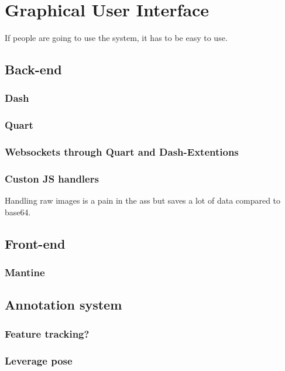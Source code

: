 \chapter{Graphical User Interface}
If people are going to use the system, it has to be easy to use.

\section{Back-end}
\subsection{Dash}
\subsection{Quart}
\subsection{Websockets through Quart and Dash-Extentions}
\subsection{Custon JS handlers}
Handling raw images is a pain in the ass but saves a lot of data compared to base64.

\section{Front-end}
\subsection{Mantine}


\section{Annotation system}
\subsection{Feature tracking?}
\subsection{Leverage pose}
